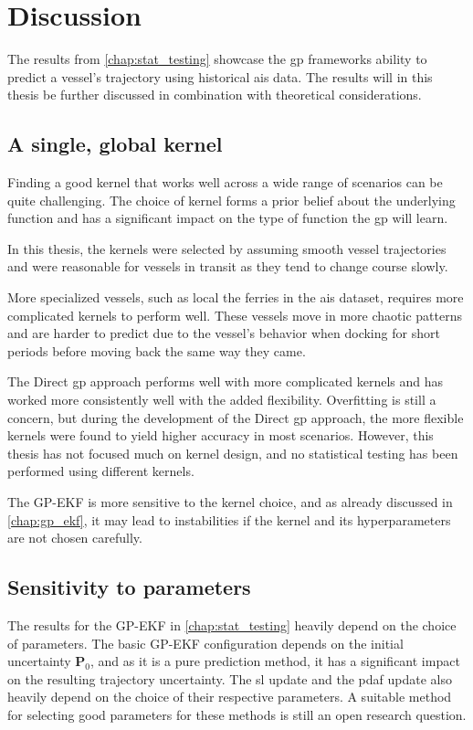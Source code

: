 \chapter{Discussion}\label{chap:discussion}

The results from \cref{chap:stat_testing} showcase the \acrshort{gp} frameworks ability to predict a vessel's trajectory using historical \acrshort{ais} data. The results will in this thesis be further discussed in combination with theoretical considerations.

\section{A single, global kernel}
Finding a good kernel that works well across a wide range of scenarios can be quite challenging. The choice of kernel forms a prior belief about the underlying function and has a significant impact on the type of function the \acrshort{gp} will learn. 

In this thesis, the kernels were selected by assuming smooth vessel trajectories and were reasonable for vessels in transit as they tend to change course slowly. 

More specialized vessels, such as local the ferries in the \acrshort{ais} dataset, requires more complicated kernels to perform well. These vessels move in more chaotic patterns and are harder to predict due to the vessel's behavior when docking for short periods before moving back the same way they came. 

The Direct \acrshort{gp} approach performs well with more complicated kernels and has worked more consistently well with the added flexibility. Overfitting is still a concern, but during the development of the Direct \acrshort{gp} approach, the more flexible kernels were found to yield higher accuracy in most scenarios. However,  this thesis has not focused much on kernel design, and no statistical testing has been performed using different kernels. 

The GP-EKF is more sensitive to the kernel choice, and as already discussed in \cref{chap:gp_ekf}, it may lead to instabilities if the kernel and its hyperparameters are not chosen carefully.  

\section{Sensitivity to parameters}
The results for the GP-EKF in \cref{chap:stat_testing} heavily depend on the choice of parameters. The basic GP-EKF configuration depends on the initial uncertainty $\boldsymbol{P}_0$, and as it is a pure prediction method, it has a significant impact on the resulting trajectory uncertainty. The \acrshort{sl} update and the \acrshort{pdaf} update also heavily depend on the choice of their respective parameters. A suitable method for selecting good parameters for these methods is still an open research question. 

